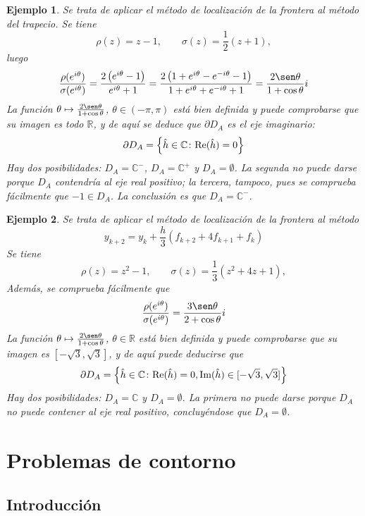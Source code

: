 \documentclass[11pt]{report}
\theoremstyle{mytheorem}
\theoremstyle{mydefinition}
\theoremstyle{myexample}
\newtheorem*{example}{Ejemplo}
\newcommand{\R}{\mathbb R}
\newcommand{\C}{\mathbb C}
\begin{document}
\begin{example}
Se trata de aplicar el método de localización de la frontera al método del trapecio. Se tiene
\[\rho(z) = z-1, \qquad \sigma(z)=\frac{1}{2}(z+1),\]
luego
\[\frac{\rho(e^{i\theta})}{\sigma(e^{i\theta})} = \frac{2\left(e^{i\theta}-1\right)}{e^{i\theta}+1} = \frac{2\left(1+e^{i\theta}-e^{-i\theta}-1\right)}{1+e^{i\theta}+e^{-i\theta}+1} = \frac{2\sen\theta}{1+\cos\theta}i\]
La función $\theta \mapsto \frac{2\sen\theta}{1+\cos\theta}$, $\theta \in (-\pi,\pi)$ está bien definida y puede comprobarse que su imagen es todo $\R$, y de aquí se deduce que $\partial D_A$ es el eje imaginario:
\[\partial D_A = \left\{\hat{h} \in \C \colon \textup{Re}(\hat{h}) = 0\right\}\]
Hay dos posibilidades: $D_A = \C^-$, $D_A = \C^+$ y $D_A = \emptyset$. La segunda no puede darse porque $D_A$ contendría al eje real positivo; la tercera, tampoco, pues se comprueba fácilmente que $-1 \in D_A$. La conclusión es que $D_A = \C^-$.
\end{example}

\begin{example}
Se trata de aplicar el método de localización de la frontera al método
\[y_{k+2} = y_{k}+\frac{h}{3}\left(f_{k+2}+4f_{k+1}+f_k\right)\]
Se tiene
\[\rho(z) = z^2-1, \qquad \sigma(z)=\frac{1}{3}\left(z^2+4z+1\right),\]
Además, se comprueba fácilmente que
\[\frac{\rho(e^{i\theta})}{\sigma(e^{i\theta})}=\frac{3\sen\theta
}{2+\cos\theta}i\]
La función $\theta \mapsto \frac{2\sen\theta}{1+\cos\theta}$, $\theta \in \R$ está bien definida y puede comprobarse que su imagen es $[-\sqrt{3},\sqrt{3}]$, y de aquí puede deducirse que
\[\partial D_A = \left\{\hat{h} \in \C \colon \textup{Re}(\hat{h}) = 0, \textup{Im}(\hat{h}) \in [-\sqrt{3},\sqrt{3}]\right\}\]
Hay dos posibilidades: $D_A = \C$ y $D_A = \emptyset$. La primera no puede darse porque $D_A$ no puede contener al eje real positivo, concluyéndose que $D_A = \emptyset$.
\end{example}

\chapter{Problemas de contorno}

\section{Introducción}
\end{document}
